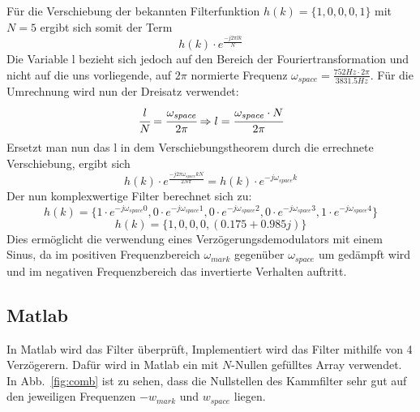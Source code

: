 \documentclass{article}
\begin{document}
Für die Verschiebung der bekannten Filterfunktion $h(k) = \{1,0,0,0,1\}$ mit $N=5$ ergibt sich somit der Term
$$
h(k) \cdot e^{\frac{-j2\pi{lk}}{N}}
$$
Die Variable l bezieht sich jedoch auf den Bereich der Fouriertransformation und nicht auf die uns vorliegende, auf $2\pi$ normierte Frequenz $\omega_{space} = \frac{752Hz\cdot{2\pi}}{3831.5Hz}$. Für die Umrechnung wird nun der Dreisatz verwendet:
$$
\cfrac{l}{N} = \cfrac{\omega_{space}}{2\pi} \Rightarrow l=\cfrac{\omega_{space} \cdot N}{2\pi}
$$
Ersetzt man nun das l in dem Verschiebungstheorem durch die errechnete Verschiebung, ergibt sich
$$
h(k) \cdot e^{\frac{-j2\pi\omega_{space}kN}{2N\pi}} = h(k) \cdot e^{-j\omega_{space}k}
$$
Der nun komplexwertige Filter berechnet sich zu:
$$
h(k) = \{ 1 \cdot e^{-j\omega_{space}0} , 0 \cdot e^{-j\omega_{space}1} , 0 \cdot e^{-j\omega_{space}2} , 0 \cdot e^{-j\omega_{space}3} , 1 \cdot e^{-j\omega_{space}4}\}
$$
$$
h(k) = \{ 1, 0, 0, 0, (0.175 + 0.985j) \}
$$
Dies ermöglicht die verwendung eines Verzögerungsdemodulators mit einem Sinus, da im positiven Frequenzbereich $\omega_{mark}$ gegenüber $\omega_{space}$ um gedämpft wird und im negativen Frequenzbereich das invertierte Verhalten auftritt.

\subsection{Matlab}
In Matlab wird das Filter überprüft, Implementiert wird das Filter mithilfe von 4 Verzögerern.
Dafür wird in Matlab ein mit $N$-Nullen gefülltes Array verwendet. In Abb.~\ref{fig:comb} ist zu sehen,
dass die Nullstellen des Kammfilter sehr gut auf den jeweiligen Frequenzen $- w_{mark}$ und $w_{space}$ liegen.

%    
%    
\end{document}
